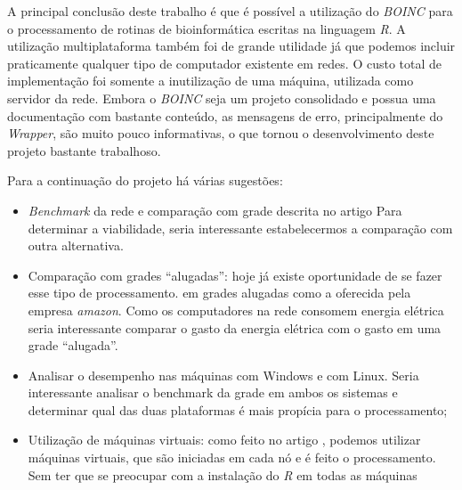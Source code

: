 
A principal conclusão deste trabalho é que é possível a utilização do \emph{BOINC} para o processamento
de rotinas de bioinformática escritas na linguagem \emph{R}. A utilização multiplataforma
também foi de grande utilidade já que podemos incluir praticamente qualquer tipo de computador 
existente em redes. O custo total de implementação foi somente a inutilização de uma máquina, utilizada
como servidor da rede. Embora o \emph{BOINC} seja um projeto consolidado e possua uma documentação com bastante conteúdo,
as mensagens de erro, principalmente do \emph{Wrapper}, são muito pouco informativas, o que tornou o desenvolvimento 
deste projeto bastante trabalhoso.

Para a continuação do projeto há várias sugestões:

\begin{itemize}
  \item \emph{Benchmark} da rede e comparação com grade descrita no artigo \cite{Dias}
Para determinar a viabilidade, seria interessante estabelecermos a comparação com outra 
alternativa. 
  \item Comparação com grades ``alugadas'': hoje já existe oportunidade de se fazer esse tipo de processamento.
em grades alugadas como a oferecida pela empresa \emph{amazon}. Como os computadores na rede 
consomem energia elétrica seria interessante comparar o gasto da energia elétrica com o gasto em 
uma grade ``alugada''.
  \item Analisar o desempenho nas máquinas com Windows e com Linux. Seria interessante analisar 
o benchmark da grade em ambos os sistemas e determinar qual das duas plataformas é mais
propícia para o processamento;
  \item Utilização de máquinas virtuais: como feito no artigo \cite{boinc}, podemos utilizar
máquinas virtuais, que são iniciadas em cada nó e é feito o processamento. Sem ter que se preocupar
com a instalação do \emph{R} em todas as máquinas 
\end{itemize}


